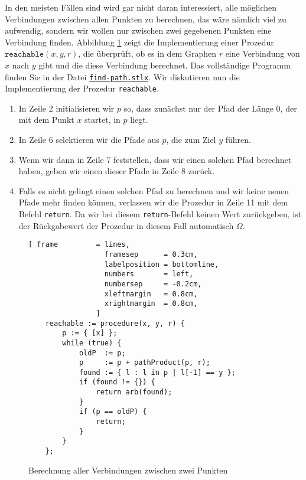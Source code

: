 In den meisten F\"{a}llen sind wird gar nicht daran interessiert, alle m\"{o}glichen Verbindungen
zwischen allen Punkten zu berechnen, das w\"{a}re n\"{a}mlich viel zu aufwendig, sondern wir
wollen nur zwischen zwei gegebenen Punkten 
eine Verbindung finden.  Abbildung \ref{fig:find-path} zeigt die Implementierung einer
Prozedur $\texttt{reachable}(x, y, r)$, die \"{u}berpr\"{u}ft, ob es in dem Graphen $r$ eine
Verbindung von $x$ nach $y$ gibt und die diese Verbindung berechnet.  Das vollst\"{a}ndige
Programm finden Sie in der Datei
\href{https://github.com/karlstroetmann/Logik/blob/master/SetlX/find-path.stlx}{\texttt{find-path.stlx}}.
Wir diskutieren nun die Implementierung der Prozedur \texttt{reachable}.
\begin{enumerate}
\item In Zeile 2 initialisieren wir $p$ so, dass zun\"{a}chst nur der Pfad der L\"{a}nge 0,
      der mit dem Punkt $x$  startet, in $p$ liegt.
\item In Zeile 6 selektieren wir die Pfade aus $p$, die zum Ziel $y$ f\"{u}hren.
\item Wenn wir dann in Zeile 7 feststellen, dass wir einen solchen Pfad berechnet haben,
      geben wir einen dieser Pfade in Zeile 8 zur\"{u}ck.
\item Falls es nicht gelingt einen solchen Pfad zu berechnen und wir keine neuen
      Pfade mehr finden k\"{o}nnen, verlassen wir die Prozedur in Zeile 11
      mit dem Befehl \texttt{return}.  Da wir bei diesem \texttt{return}-Befehl
      keinen Wert zur\"{u}ckgeben, ist der R\"{u}ckgabewert der Prozedur in diesem Fall
      automatisch $\Omega$.
\end{enumerate}

\begin{figure}[!ht]
  \centering
\begin{Verbatim}[ frame         = lines, 
                  framesep      = 0.3cm, 
                  labelposition = bottomline,
                  numbers       = left,
                  numbersep     = -0.2cm,
                  xleftmargin   = 0.8cm,
                  xrightmargin  = 0.8cm,
                ]
    reachable := procedure(x, y, r) {
        p := { [x] };
        while (true) {
            oldP  := p;
            p     := p + pathProduct(p, r);
            found := { l : l in p | l[-1] == y };
            if (found != {}) {
                return arb(found);
            }
            if (p == oldP) {
                return;
            }
        }
    };
\end{Verbatim} 
\vspace*{-0.3cm}
\caption{Berechnung aller Verbindungen zwischen zwei Punkten}  
\label{fig:find-path}
\end{figure} %

